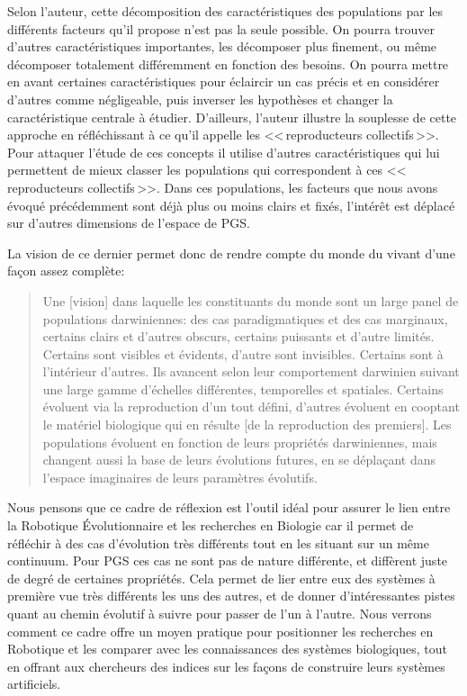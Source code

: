 Selon l'auteur, cette décomposition des caractéristiques des populations par les différents facteurs qu'il propose n'est pas la seule possible. On pourra trouver d'autres caractéristiques importantes, les décomposer plus finement, ou même décomposer totalement différemment en fonction des besoins.  On pourra mettre en avant certaines caractéristiques pour éclaircir un cas précis et en considérer d'autres comme négligeable, puis inverser les hypothèses et changer la caractéristique centrale à étudier. D'ailleurs, l'auteur illustre la souplesse de cette approche en réfléchissant à ce qu'il appelle les <<\,reproducteurs collectifs\,>>. Pour attaquer l'étude de ces concepts il utilise d'autres caractéristiques qui lui permettent de mieux classer les populations qui correspondent à ces <<\,reproducteurs collectifs\,>>. Dans ces populations, les facteurs que nous avons évoqué précédemment sont déjà plus ou moins clairs et fixés, l'intérêt est déplacé sur d'autres dimensions de l'espace de PGS.

La vision de ce dernier permet donc de rendre compte du monde du vivant d'une façon assez complète:
\begin{quotation}
	Une [vision] dans laquelle les constituants du monde sont un large panel de populations darwiniennes: des cas paradigmatiques et des cas marginaux, certains clairs et d'autres obscurs, certains puissants et d'autre limités. Certains sont visibles et évidents, d'autre sont invisibles. Certains sont à l'intérieur d'autres. Ils avancent selon leur comportement darwinien suivant une large gamme d'échelles différentes, temporelles et spatiales. Certains évoluent via la reproduction d'un tout défini, d'autres évoluent en cooptant le matériel biologique qui en résulte [de la reproduction des premiers]. Les populations évoluent en fonction de leurs propriétés darwiniennes, mais changent aussi la base de leurs évolutions futures, en se déplaçant dans l'espace imaginaires de leurs paramètres évolutifs.\\
	\citep[p.~128]{godfrey2009darwinian}
\end{quotation}

Nous pensons que ce cadre de réflexion est l'outil idéal pour assurer le lien entre la Robotique \'Evolutionnaire et les recherches en Biologie car il permet de réfléchir à des cas d'évolution très différents tout en les situant sur un même continuum. Pour PGS ces cas ne sont pas de nature différente, et diffèrent juste de degré de certaines propriétés. Cela permet de lier entre eux des systèmes à première vue très différents les uns des autres, et de donner d'intéressantes pistes quant au chemin évolutif à suivre pour passer de l'un à l'autre.  Nous verrons comment ce cadre offre un moyen pratique pour positionner les recherches en Robotique et les comparer avec les connaissances des systèmes biologiques, tout en offrant aux chercheurs des indices sur les façons de construire leurs systèmes artificiels.


